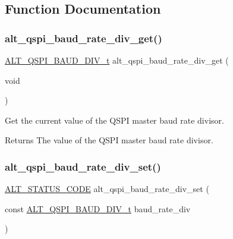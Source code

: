 \subsection{Function Documentation}
\mbox{\label{group__ALT__QSPI__DEV__CFG_ga49ab5eb9e2067a6724b0bd41162eb359}} 
\subsubsection{\texorpdfstring{alt\_qspi\_baud\_rate\_div\_get()}{alt\_qspi\_baud\_rate\_div\_get()}}
{\footnotesize\ttfamily \mbox{\hyperlink{group__ALT__QSPI__DEV__CFG_ga5a183c627f4dc5f1469a227c748b01ec}{A\+L\+T\+\_\+\+Q\+S\+P\+I\+\_\+\+B\+A\+U\+D\+\_\+\+D\+I\+V\+\_\+t}} alt\+\_\+qspi\+\_\+baud\+\_\+rate\+\_\+div\+\_\+get (\begin{DoxyParamCaption}\item[{void}]{ }\end{DoxyParamCaption})}

Get the current value of the Q\+S\+PI master baud rate divisor.

\begin{DoxyReturn}{Returns}
The value of the Q\+S\+PI master baud rate divisor. 
\end{DoxyReturn}
\mbox{\label{group__ALT__QSPI__DEV__CFG_ga964033a111f879c5ddfab32cfec0b5f6}} 
\subsubsection{\texorpdfstring{alt\_qspi\_baud\_rate\_div\_set()}{alt\_qspi\_baud\_rate\_div\_set()}}
{\footnotesize\ttfamily \mbox{\hyperlink{hwlib_8h_abdb0d369f069723ca55d6c94bcaaaa12}{A\+L\+T\+\_\+\+S\+T\+A\+T\+U\+S\+\_\+\+C\+O\+DE}} alt\+\_\+qspi\+\_\+baud\+\_\+rate\+\_\+div\+\_\+set (\begin{DoxyParamCaption}\item[{const \mbox{\hyperlink{group__ALT__QSPI__DEV__CFG_ga5a183c627f4dc5f1469a227c748b01ec}{A\+L\+T\+\_\+\+Q\+S\+P\+I\+\_\+\+B\+A\+U\+D\+\_\+\+D\+I\+V\+\_\+t}}}]{baud\+\_\+rate\+\_\+div }\end{DoxyParamCaption})}

